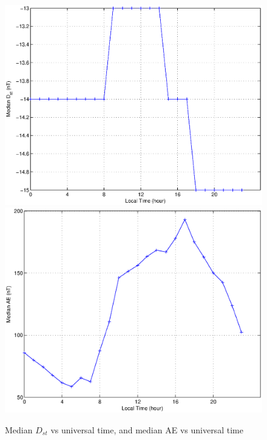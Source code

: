 \documentclass[10pt,twocolumn]{article}
\begin{document}
\begin{figure}[htp!]
\includegraphics[scale=0.45]{paperfigures/DstLT.eps}
\includegraphics[scale=0.45]{paperfigures/AELT.eps}
\caption{Median $D_{st}$ vs universal time, and median AE vs universal time}
\end{figure}
\clearpage
\end{document}
